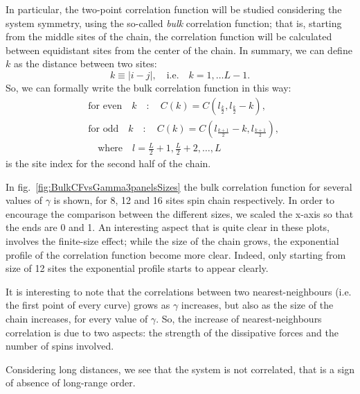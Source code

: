 In particular, the two-point correlation function will be studied considering the system symmetry, using the so-called \emph{bulk} correlation function; that is, starting from the middle sites of the chain, the correlation function will be calculated between equidistant sites from the center of the chain. In summary, we can define $k$ as the distance between two sites:
\begin{equation*}
    k \equiv |i-j|, \quad \text{i.e.} \quad k = 1, \dots L-1.
\end{equation*}
So, we can formally write the bulk correlation function in this way:
\begin{equation*}
\begin{split}
    &\text{for even} \quad k \quad : \quad C(k) = C(l_{\frac{k}{2}}, l_{\frac{k}{2}}-k),\\
    &\text{for odd} \quad k \quad : \quad C(k) = C(l_{\frac{k+1}{2}}-k, l_{\frac{k+1}{2}}),\\
    & \quad \text{where} \quad l = \frac{L}{2}+1, \frac{L}{2}+2, \dots, L
\end{split}
\end{equation*}
is the site index for the second half of the chain.

In fig.~\ref{fig:BulkCFvsGamma3panelsSizes} the bulk correlation function for several values of $\gamma$ is shown, for 8, 12 and 16 sites spin chain respectively. In order to encourage the comparison between the different sizes, we scaled the x-axis so that the ends are 0 and 1. An interesting aspect that is quite clear in these plots, involves the finite-size effect; while the size of the chain grows, the exponential profile of the correlation function become more clear. Indeed, only starting from size of 12 sites the exponential profile starts to appear clearly.

It is interesting to note that the correlations between two nearest-neighbours (i.e. the first point of every curve) grows as $\gamma$ increases, but also as the size of the chain increases, for every value of $\gamma$. So, the increase of nearest-neighbours correlation is due to two aspects: the strength of the dissipative forces and the number of spins involved.

Considering long distances, we see that the system is not correlated, that is a sign of absence of long-range order. 

